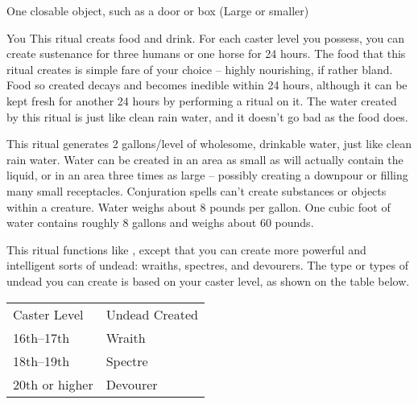 \begin{spelltarget}{One closable object, such as a door or box (Large or smaller)}
\begin{spelltarget}{You}
\spelleffect This ritual creats food and drink. For each caster level you possess, you can create sustenance for three humans or one horse for 24 hours. The food that this ritual creates is simple fare of your choice -- highly nourishing, if rather bland. Food so created decays and becomes inedible within 24 hours, although it can be kept fresh for another 24 hours by performing a  ritual on it. The water created by this ritual is just like clean rain water, and it doesn't go bad as the food does.

\spelleffect This ritual generates 2 gallons/level of wholesome, drinkable water, just like clean rain water. Water can be created in an area as small as will actually contain the liquid, or in an area three times as large -- possibly creating a downpour or filling many small receptacles.
\spellnotes Conjuration spells can't create substances or objects within a creature. Water weighs about 8 pounds per gallon. One cubic foot of water contains roughly 8 gallons and weighs about 60 pounds.

\spelleffect This ritual functions like , except that you can create more powerful and intelligent sorts of undead: wraiths, spectres, and devourers. The type or types of undead you can create is based on your caster level, as shown on the table below.
\begin{dtable}
    \begin{tabularx}{\columnwidth}{*{2}{>{\lcol}X}}
        Caster Level & Undead Created \\
        16th--17th & Wraith \\
        18th--19th & Spectre \\
        20th or higher & Devourer \\
    \end{tabularx}
\end{dtable}


\end{spelltarget}
\end{spelltarget}
